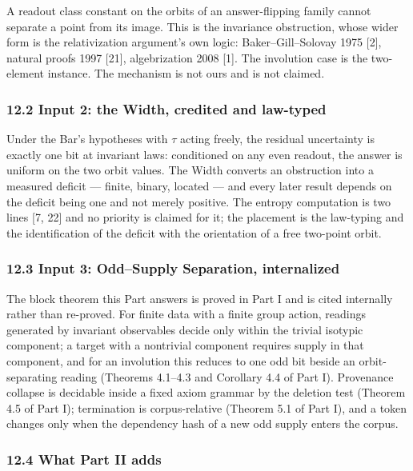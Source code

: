 \documentclass[10pt,twocolumn]{article}
\begin{document}
A readout class constant on the orbits of an answer-flipping family
cannot separate a point from its image. This is the invariance
obstruction, whose wider form is the relativization argument's own
logic: Baker--Gill--Solovay 1975 {[}2{]}, natural proofs 1997 {[}21{]},
algebrization 2008 {[}1{]}. The involution case is the two-element
instance. The mechanism is not ours and is not claimed.

\subsubsection{12.2 Input 2: the Width, credited and
law-typed}\label{input-2-the-width-credited-and-law-typed}

Under the Bar's hypotheses with \(\tau\) acting freely, the residual
uncertainty is exactly one bit at invariant laws: conditioned on any
even readout, the answer is uniform on the two orbit values. The Width
converts an obstruction into a measured deficit --- finite, binary,
located --- and every later result depends on the deficit being one and
not merely positive. The entropy computation is two lines {[}7, 22{]}
and no priority is claimed for it; the placement is the law-typing and
the identification of the deficit with the orientation of a free
two-point orbit.

\subsubsection{12.3 Input 3: Odd--Supply Separation,
internalized}\label{input-3-oddsupply-separation-internalized}

The block theorem this Part answers is proved in Part I and is cited
internally rather than re-proved. For finite data with a finite group
action, readings generated by invariant observables decide only within
the trivial isotypic component; a target with a nontrivial component
requires supply in that component, and for an involution this reduces to
one odd bit beside an orbit-separating reading (Theorems 4.1--4.3 and
Corollary 4.4 of Part I). Provenance collapse is decidable inside a
fixed axiom grammar by the deletion test (Theorem 4.5 of Part I);
termination is corpus-relative (Theorem 5.1 of Part I), and a token
changes only when the dependency hash of a new odd supply enters the
corpus.

\subsubsection{12.4 What Part II adds}\label{what-part-ii-adds}
\end{document}
